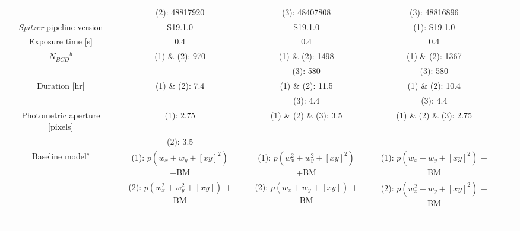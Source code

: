 \documentclass[traditabstract]{aa}
\begin{document}
\begin{appendix}
\begin{table*}
\begin{center}
{\begin{tabular}{cccccc}
                                                                           & (2): 48817920                      & (3): 48407808            & (3): 48816896               \\ \noalign {\smallskip}                                                                
{\it Spitzer} pipeline version                               & S19.1.0                                 & S19.1.0                       & (1): S19.1.0                  \\ \noalign {\smallskip}     
Exposure time [s]                                               & 0.4                                       & 0.4                                & 0.4                               \\ \noalign {\smallskip} 
$N_{BCD}$$^b$                                                & (1) \& (2): 970                      & (1) \& (2): 1498              & (1) \& (2): 1367                     \\ \noalign {\smallskip} 
                                                                           &                                           &   (3): 580                    & (3): 580                 \\ \noalign {\smallskip} 
Duration  [hr]                                                      & (1) \& (2): 7.4                                & (1) \& (2):  11.5                         & (1) \& (2): 10.4                         \\ \noalign {\smallskip}  
                                                                           &                                   & (3):  4.4                        & (3): 4.4                       \\ \noalign {\smallskip} 
Photometric aperture [pixels]                             & (1): 2.75                              & (1) \& (2) \& (3): 3.5        & (1) \& (2) \& (3): 2.75                         \\ \noalign {\smallskip}  
                                                                          & (2): 3.5                                 &                                      &                                     \\ \noalign {\smallskip}  
Baseline  model$^c$   & (1): $p(w_x +w_y + [xy]^2) $ +BM         &  (1): $p(w_x^2 + w_y^2 + [xy]^2) $ +BM  & (1): $p(w_x + w_y + [xy]^2 )$ + BM     \\ \noalign {\smallskip} 
                                    & (2): $p(w_x^2 + w_y^2 + [xy])$   + BM   & (2): $p(w_x + w_y + [xy]) $ + BM                      & (2): $p(w_x^2 + w_y + [xy]^2 )$ + BM     \\ \noalign {\smallskip} 
$$
\end{tabular}}
\end{center}
\end{table*}
\end{appendix}
\end{document}

